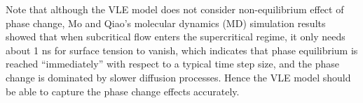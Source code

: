 {    Note that although the VLE model does not consider non-equilibrium effect of phase change, Mo and Qiao's molecular dynamics (MD) simulation results \cite{mo2017molecular} showed that when subcritical flow enters the supercritical regime, it only needs about 1 ns for surface tension to vanish, which indicates that phase equilibrium is reached ``immediately'' with respect to a typical time step size, and the phase change is dominated by slower diffusion processes. Hence the VLE model should be able to capture the phase change effects accurately.
    

}
